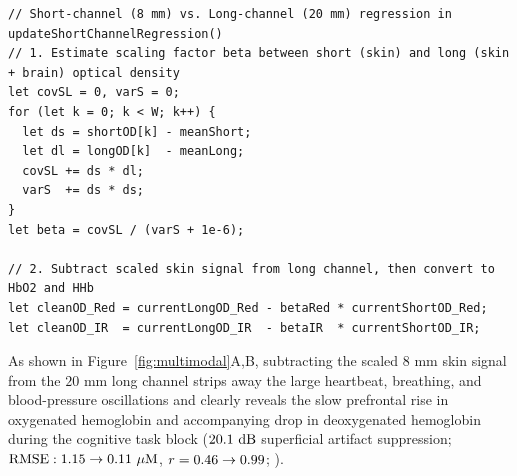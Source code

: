 \documentclass[11pt]{article}
\begin{document}
\noindent\begin{minipage}{\textwidth}
\begin{lstlisting}
// Short-channel (8 mm) vs. Long-channel (20 mm) regression in updateShortChannelRegression()
// 1. Estimate scaling factor beta between short (skin) and long (skin + brain) optical density
let covSL = 0, varS = 0;
for (let k = 0; k < W; k++) {
  let ds = shortOD[k] - meanShort;
  let dl = longOD[k]  - meanLong;
  covSL += ds * dl;
  varS  += ds * ds;
}
let beta = covSL / (varS + 1e-6);

// 2. Subtract scaled skin signal from long channel, then convert to HbO2 and HHb
let cleanOD_Red = currentLongOD_Red - betaRed * currentShortOD_Red;
let cleanOD_IR  = currentLongOD_IR  - betaIR  * currentShortOD_IR;
\end{lstlisting}
\end{minipage}
\vspace{4pt}

As shown in Figure~\ref{fig:multimodal}A,B, subtracting the scaled $8\text{ mm}$ skin signal from the $20\text{ mm}$ long channel strips away the large heartbeat, breathing, and blood-pressure oscillations and clearly reveals the slow prefrontal rise in oxygenated hemoglobin and accompanying drop in deoxygenated hemoglobin during the cognitive task block ($20.1\text{ dB}$ superficial artifact suppression; $\text{RMSE}: 1.15 \rightarrow 0.11\ \mu\text{M}$, $r = 0.46 \rightarrow 0.99$; \citealp{wyser2020short,russo2025fnirs}).
\end{document}
